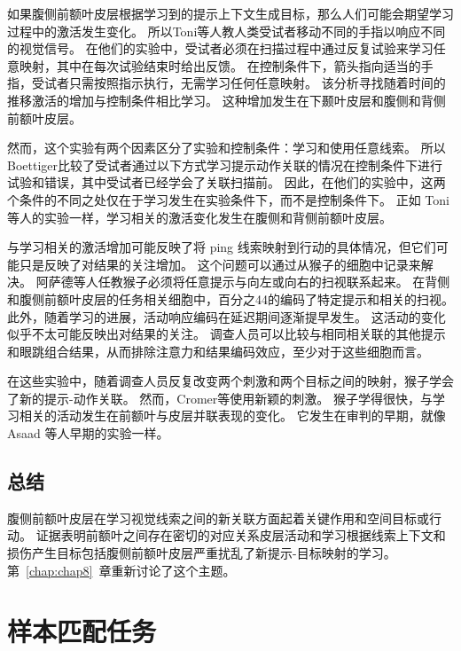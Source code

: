 如果腹侧前额叶皮层根据学习到的提示上下文生成目标，那么人们可能会期望学习过程中的激活发生变化。 
所以Toni等人\cite{toni2001learning}教人类受试者移动不同的手指以响应不同的视觉信号。 
在他们的实验中，受试者必须在扫描过程中通过反复试验来学习任意映射，其中在每次试验结束时给出反馈。
在控制条件下，箭头指向适当的手指，受试者只需按照指示执行，无需学习任何任意映射。
该分析寻找随着时间的推移激活的增加与控制条件相比学习。
这种增加发生在下颞叶皮层和腹侧和背侧前额叶皮层。
\par


然而，这个实验有两个因素区分了实验和控制条件：学习和使用任意线索。 
所以 Boettiger\cite{boettiger2005frontal}比较了受试者通过以下方式学习提示动作关联的情况在控制条件下进行试验和错误，其中受试者已经学会了关联扫描前。 
因此，在他们的实验中，这两个条件的不同之处仅在于学习发生在实验条件下，而不是控制条件下。 
正如 Toni 等人的实验一样\cite{toni2001learning}，学习相关的激活变化发生在腹侧和背侧前额叶皮层。
\par


与学习相关的激活增加可能反映了将 ping 线索映射到行动的具体情况，但它们可能只是反映了对结果的关注增加。
这个问题可以通过从猴子的细胞中记录来解决。
阿萨德等人\cite{asaad1998neural}任教猴子必须将任意提示与向左或向右的扫视联系起来。 
在背侧和腹侧前额叶皮层的任务相关细胞中，百分之44的编码了特定提示和相关的扫视。
此外，随着学习的进展，活动响应编码在延迟期间逐渐提早发生。
这活动的变化似乎不太可能反映出对结果的关注。
调查人员可以比较与相同相关联的其他提示和眼跳组合结果，从而排除注意力和结果编码效应，至少对于这些细胞而言。
\par


在这些实验中，随着调查人员反复改变两个刺激和两个目标之间的映射，猴子学会了新的提示-动作关联。 
然而，Cromer等\cite{cromer2011rapid}使用新颖的刺激。 猴子学得很快，与学习相关的活动发生在前额叶与皮层并联表现的变化。 
它发生在审判的早期，就像 Asaad 等人早期的实验一样\cite{asaad1998neural}。



\subsection{总结}

腹侧前额叶皮层在学习视觉线索之间的新关联方面起着关键作用和空间目标或行动。
证据表明前额叶之间存在密切的对应关系皮层活动和学习根据线索上下文和损伤产生目标包括腹侧前额叶皮层严重扰乱了新提示-目标映射的学习。
第~\ref{chap:chap8}~章重新讨论了这个主题。



\section{样本匹配任务}
\par

